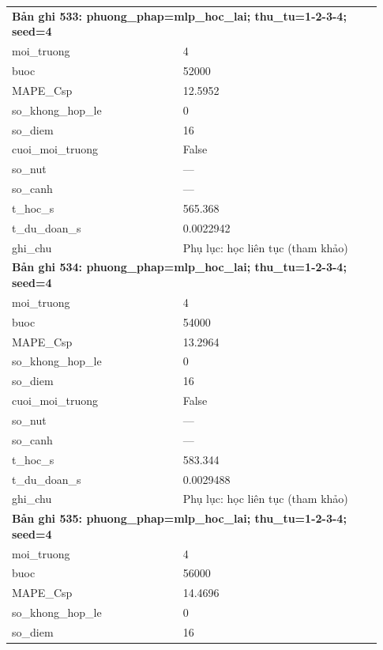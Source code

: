 \begin{longtable}{p{0.43\linewidth}p{0.50\linewidth}}
\midrule
\multicolumn{2}{p{0.95\linewidth}}{\textbf{Bản ghi 533: phuong\_phap=mlp\_hoc\_lai; thu\_tu=1-2-3-4; seed=4}} \\
moi\_\allowbreak truong & 4 \\
buoc & 52000 \\
MAPE\_\allowbreak Csp & 12.5952 \\
so\_\allowbreak khong\_\allowbreak hop\_\allowbreak le & 0 \\
so\_\allowbreak diem & 16 \\
cuoi\_\allowbreak moi\_\allowbreak truong & False \\
so\_\allowbreak nut & — \\
so\_\allowbreak canh & — \\
t\_\allowbreak hoc\_\allowbreak s & 565.368 \\
t\_\allowbreak du\_\allowbreak doan\_\allowbreak s & 0.0022942 \\
ghi\_\allowbreak chu & Phụ lục: học liên tục (tham khảo) \\
\midrule
\multicolumn{2}{p{0.95\linewidth}}{\textbf{Bản ghi 534: phuong\_phap=mlp\_hoc\_lai; thu\_tu=1-2-3-4; seed=4}} \\
moi\_\allowbreak truong & 4 \\
buoc & 54000 \\
MAPE\_\allowbreak Csp & 13.2964 \\
so\_\allowbreak khong\_\allowbreak hop\_\allowbreak le & 0 \\
so\_\allowbreak diem & 16 \\
cuoi\_\allowbreak moi\_\allowbreak truong & False \\
so\_\allowbreak nut & — \\
so\_\allowbreak canh & — \\
t\_\allowbreak hoc\_\allowbreak s & 583.344 \\
t\_\allowbreak du\_\allowbreak doan\_\allowbreak s & 0.0029488 \\
ghi\_\allowbreak chu & Phụ lục: học liên tục (tham khảo) \\
\midrule
\multicolumn{2}{p{0.95\linewidth}}{\textbf{Bản ghi 535: phuong\_phap=mlp\_hoc\_lai; thu\_tu=1-2-3-4; seed=4}} \\
moi\_\allowbreak truong & 4 \\
buoc & 56000 \\
MAPE\_\allowbreak Csp & 14.4696 \\
so\_\allowbreak khong\_\allowbreak hop\_\allowbreak le & 0 \\
so\_\allowbreak diem & 16 \\

\end{longtable}
